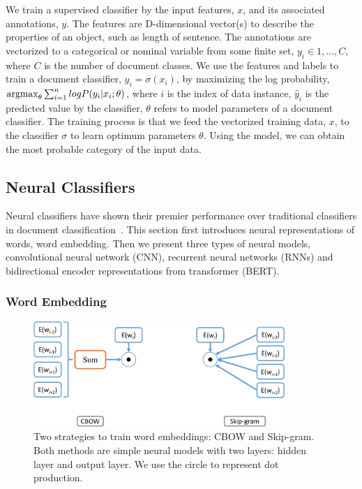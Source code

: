 We train a supervised classifier by the input features, $x$, and its associated annotations, $y$. The features are D-dimensional vector(s) to describe the properties of an object, such as length of sentence. The annotations are vectorized to a categorical or nominal variable from some finite set, $y_i \in {1, ..., C}$, where $C$ is the number of document classes. We use the features and labels to train a document classifier, $\hat{y}_i = \sigma(x_i)$, by maximizing the log probability, $\operatorname*{argmax}_{\theta}\sum_{i=1}^nlog P(y_i | x_i; \theta)$, where $i$ is the index of data instance, $\hat{y}_i$ is the predicted value by the classifier, $\theta$ refers to model parameters of a document classifier. The training process is that we feed the vectorized training data, $x$, to the classifier $\sigma$ to learn optimum parameters $\theta$. Using the model, we can obtain the most probable category of the input data.


\subsection{Neural Classifiers}

Neural classifiers have shown their premier performance over traditional classifiers in document classification~\cite{mikolov2013distributed, kim2014convolutional}.
This section first introduces neural representations of words, word embedding.
Then we present three types of neural models, convolutional neural network (CNN), recurrent neural networks (RNNs) and bidirectional encoder representations from transformer (BERT).

\subsubsection{Word Embedding}
\label{chap2:subsubsec:emb}

\begin{figure}[t!]
\centering
\includegraphics[width=0.85\textwidth]{images/chapter2/word2vec.pdf}
\caption{Two strategies to train word embeddings: CBOW and Skip-gram. Both methods are simple neural models with two layers: hidden layer and output layer. We use the circle to represent dot production.}
\label{chap2:fig:embd}
\end{figure}

